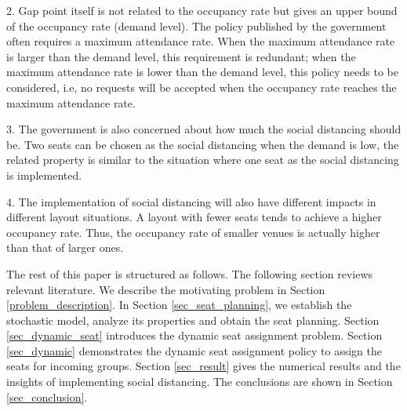 2. Gap point itself is not related to the occupancy rate but gives an upper bound of the occupancy rate (demand level). The policy published by the government often requires a maximum attendance rate.
When the maximum attendance rate is larger than the demand level, this requirement is redundant; when the maximum attendance rate is lower than the demand level, this policy needs to be considered, i.e, no requests will be accepted when the occupancy rate reaches the maximum attendance rate.



3. The government is also concerned about how much the social distancing should be. Two seats can be chosen as the social distancing when the demand is low, the related property is similar to the situation where one seat as the social distancing is implemented.


4. The implementation of social distancing will also have different impacts in different layout situations. A layout with fewer seats tends to achieve a higher occupancy rate. Thus, the occupancy rate of smaller venues is actually higher than that of larger ones.


The rest of this paper is structured as follows. The following section reviews relevant literature. We describe the motivating problem in Section \ref{problem_description}. In Section \ref{sec_seat_planning}, we establish the stochastic model, analyze its properties and obtain the seat planning. Section \ref{sec_dynamic_seat} introduces the dynamic seat assignment problem.
Section \ref{sec_dynamic} demonstrates the dynamic seat assignment policy to assign the seats for incoming groups. Section \ref{sec_result} gives the numerical results and the insights of implementing social distancing. The conclusions are shown in Section \ref{sec_conclusion}.
\newpage
